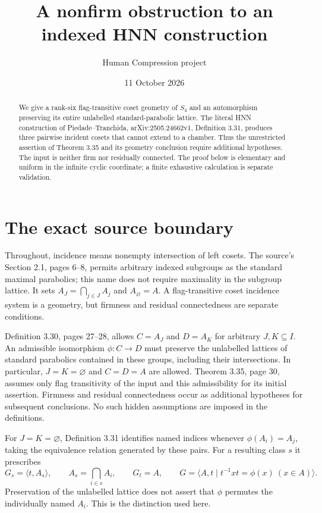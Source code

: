 \documentclass[11pt,a4paper]{article}
\title{A nonfirm obstruction to an indexed HNN construction}
\author{Human Compression project}
\date{11 October 2026}
\newcommand{\gen}[1]{\langle #1\rangle}
\begin{document}
\maketitle
\begin{abstract}
We give a rank-six flag-transitive coset geometry of $S_4$ and an
automorphism preserving its entire unlabelled standard-parabolic lattice.
The literal HNN construction of Piedade--Tranchida, arXiv:2505.24662v1,
Definition 3.31, produces three pairwise incident cosets that cannot extend
to a chamber. Thus the unrestricted assertion of Theorem 3.35 and its
geometry conclusion require additional hypotheses. The input is neither
firm nor residually connected. The proof below is elementary and uniform
in the infinite cyclic coordinate; a finite exhaustive calculation is
separate validation.
\end{abstract}

\section{The exact source boundary}
Throughout, incidence means nonempty intersection of left cosets. The
source's Section 2.1, pages 6--8, permits arbitrary indexed subgroups as
the standard maximal parabolics; this name does not require maximality in
the subgroup lattice. It sets $A_J=\bigcap_{j\in J}A_j$ and
$A_\varnothing=A$. A flag-transitive coset incidence system is a geometry,
but firmness and residual connectedness are separate conditions.

Definition 3.30, pages 27--28, allows $C=A_J$ and $D=A_K$ for arbitrary
$J,K\subseteq I$. An admissible isomorphism $\phi:C\to D$ must preserve
the unlabelled lattices of standard parabolics contained in these groups,
including their intersections. In particular, $J=K=\varnothing$ and
$C=D=A$ are allowed. Theorem 3.35, page 30, assumes only flag transitivity
of the input and this admissibility for its initial assertion. Firmness
and residual connectedness occur as additional hypotheses for subsequent
conclusions. No such hidden assumptions are imposed in the definitions.

For $J=K=\varnothing$, Definition 3.31 identifies named indices whenever
$\phi(A_i)=A_j$, taking the equivalence relation generated by these pairs.
For a resulting class $s$ it prescribes
\[
 G_s=\gen{t,A_s},\qquad A_s=\bigcap_{i\in s}A_i,
 \qquad G_t=A,
 \qquad G=\gen{A,t\mid t^{-1}xt=\phi(x)\ (x\in A)}.
\]
Preservation of the unlabelled lattice does not assert that $\phi$ permutes
the individually named $A_i$. This is the distinction used here.
\end{document}
